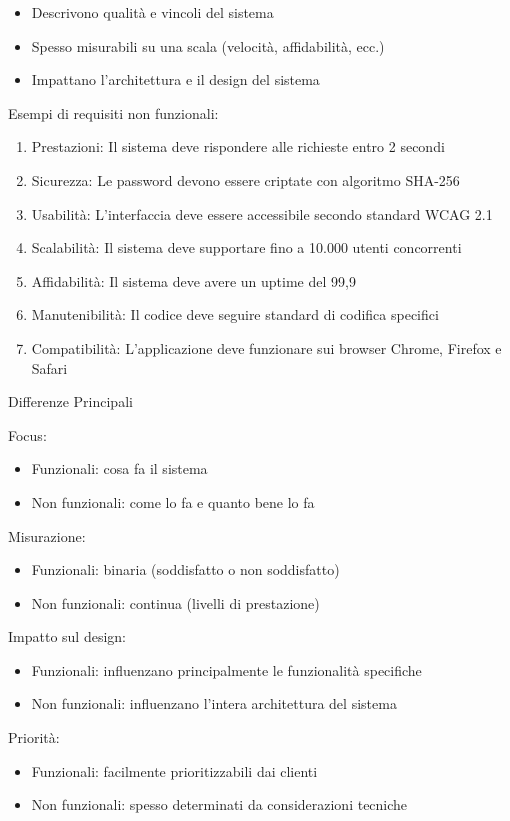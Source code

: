 \begin{itemize}
    \item Descrivono qualità e vincoli del sistema
    \item Spesso misurabili su una scala (velocità, affidabilità, ecc.)
    \item Impattano l'architettura e il design del sistema
\end{itemize}

Esempi di requisiti non funzionali:

\begin{enumerate}
    \item Prestazioni: Il sistema deve rispondere alle richieste entro 2 secondi
    \item Sicurezza: Le password devono essere criptate con algoritmo SHA-256
    \item Usabilità: L'interfaccia deve essere accessibile secondo standard WCAG 2.1
    \item Scalabilità: Il sistema deve supportare fino a 10.000 utenti concorrenti
    \item Affidabilità: Il sistema deve avere un uptime del 99,9%
    \item Manutenibilità: Il codice deve seguire standard di codifica specifici
    \item Compatibilità: L'applicazione deve funzionare sui browser Chrome, Firefox e Safari
\end{enumerate}

Differenze Principali

Focus:

\begin{itemize}
    \item Funzionali: cosa fa il sistema
    \item Non funzionali: come lo fa e quanto bene lo fa
\end{itemize}


Misurazione:

\begin{itemize}
    \item Funzionali: binaria (soddisfatto o non soddisfatto)
    \item Non funzionali: continua (livelli di prestazione)
\end{itemize}


Impatto sul design:

\begin{itemize}
    \item Funzionali: influenzano principalmente le funzionalità specifiche
    \item Non funzionali: influenzano l'intera architettura del sistema
\end{itemize}


Priorità:

\begin{itemize}
    \item Funzionali: facilmente prioritizzabili dai clienti
    \item Non funzionali: spesso determinati da considerazioni tecniche
\end{itemize}